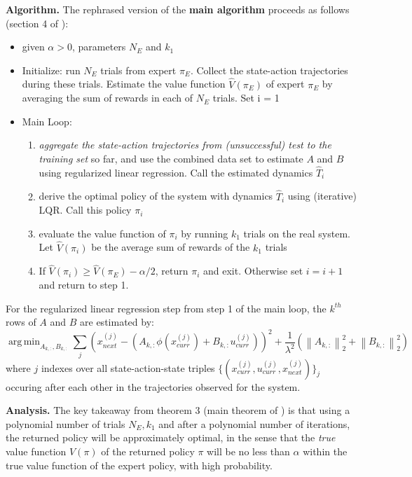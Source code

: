 \documentclass[a4paper]{article}
\DeclareMathOperator*{\argmin}{arg\,min}
\newcommand{\norm}[1]{\left\|#1\right\|}
\begin{document}
\textbf{Algorithm.} The rephrased version of the \textbf{main algorithm} proceeds as follows (section 4 of \cite{abbeel2005exploration}):
\begin{itemize}
\item given $\alpha>0$, parameters $N_E$ and $k_1$
\item Initialize: run $N_E$ trials from expert $\pi_E$. Collect the state-action trajectories during these trials. Estimate the value function $\widehat{V}(\pi_E)$ of expert $\pi_E$ by averaging the sum of rewards in each of $N_E$ trials. Set i = 1
\item Main Loop:
\begin{enumerate}
\item \textit{aggregate the state-action trajectories from (unsuccessful) test to the training set} so far, and use the combined data set to estimate $A$ and $B$ using regularized linear regression. Call the estimated dynamics $\widehat{T}_i$
\item derive the optimal policy of the system with dynamics $\widehat{T}_i$ using (iterative) LQR. Call this policy $\pi_i$
\item evaluate the value function of $\pi_i$ by running $k_1$ trials on the real system. Let $\widehat{V}(\pi_i)$ be the average sum of rewards of the $k_1$ trials
\item If $\widehat{V}(\pi_i)\geq \widehat{V}(\pi_E)-\alpha/2$, return $\pi_i$ and exit. Otherwise set $i=i+1$ and return to step 1.
\end{enumerate}
\end{itemize}
For the regularized linear regression step from step 1 of the main loop, the $k^{th}$ rows of $A$ and $B$ are estimated by:
\begin{equation}
\argmin_{A_{k,:},B_{k,:}}\sum_{j}\left(x_{next}^{(j)}-(A_{k,:}\phi(x_{curr}^{(j)}) +B_{k,:}u_{curr}^{(j)} )\right)^2+\frac{1}{\lambda^2}(\norm{A_{k,:}}_2^2 +\norm{B_{k,:}}_2^2)
\end{equation}
where $j$ indexes over all state-action-state triples $\{(x_{curr}^{(j)}, u_{curr}^{(j)},x_{next}^{(j)} )\}_j$ occuring after each other in the trajectories observed for the system.

\textbf{Analysis.} The key takeaway from theorem 3 (main theorem of \cite{abbeel2005exploration}) is that using a polynomial number of trials $N_E, k_1$ and after a polynomial number of iterations, the returned policy will be approximately optimal, in the sense that the \textit{true} value function $V(\pi)$ of the returned policy $\pi$ will be no less than $\alpha$ within the true value function of the expert policy, with high probability. 
\end{document}
